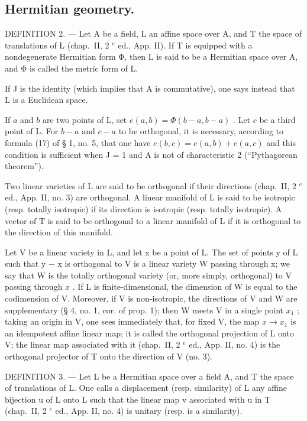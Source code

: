 \subsection{Hermitian geometry.}

DEFINITION 2. --- Let A be a field, L an affine space over A, and T the space of translations of L (chap.~II, 2 \(^{e}\) ed., App. II). If T is equipped with a nondegenerate Hermitian form Φ, then L is said to be a Hermitian space over A, and Φ is called the metric form of L.

If J is the identity (which implies that A is commutative), one says instead that L is a Euclidean space.

If \(a\) and \(b\) are two points of L, set \(e(a, b) = \Phi(b - a, b - a)\) . Let \(c\) be a third point of L. For \(b - a\) and \(c - a\) to be orthogonal, it is necessary, according to formula (17) of § 1, no. 5, that one have \(e(b, c) = e(a, b) + e(a, c)\) and this condition is sufficient when J = 1 and A is not of characteristic 2 (“Pythagorean theorem”).

Two linear varieties of L are said to be orthogonal if their directions (chap.~II, 2 \(^{e}\) ed., App. II, no. 3) are orthogonal. A linear manifold of L is said to be isotropic (resp. totally isotropic) if its direction is isotropic (resp. totally isotropic). A vector of T is said to be orthogonal to a linear manifold of L if it is orthogonal to the direction of this manifold.

Let V be a linear variety in L, and let x be a point of L. The set of points y of L such that y − x is orthogonal to V is a linear variety W passing through x; we say that W is the totally orthogonal variety (or, more simply, orthogonal) to V passing through \(x\) . If L is finite-dimensional, the dimension of W is equal to the codimension of V. Moreover, if V is non-isotropic, the directions of V and W are supplementary (§ 4, no. 1, cor. of prop. 1); then W meets V in a single point \(x_1\) ; taking an origin in V, one sees immediately that, for fixed V, the map \(x \to x_1\) is an idempotent affine linear map; it is called the orthogonal projection of L onto V; the linear map associated with it (chap.~II, 2 \(^{e}\) ed., App. II, no. 4) is the orthogonal projector of T onto the direction of V (no. 3).

DEFINITION 3. --- Let L be a Hermitian space over a field A, and T the space of translations of L. One calls a displacement (resp. similarity) of L any affine bijection u of L onto L such that the linear map v associated with u in T (chap.~II, 2 \(^{e}\) ed., App. II, no. 4) is unitary (resp. is a similarity).

